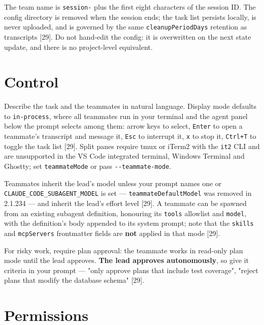 \documentclass[11pt,a4paper,twoside,openany]{book}
\begin{document}
The team name is \texttt{session-\allowbreak{}} plus the first eight characters of the session ID. The config directory is removed when the session ends; the task list persists locally, is never uploaded, and is governed by the same \texttt{cleanup\allowbreak{}Period\allowbreak{}Days} retention as transcripts [29]. Do not hand-edit the config: it is overwritten on the next state update, and there is no project-level equivalent.


\FloatBarrier
\setcounter{section}{2}
\section{Control}

Describe the task and the teammates in natural language. Display mode defaults to \texttt{in-\allowbreak{}process}, where all teammates run in your terminal and the agent panel below the prompt selects among them: arrow keys to select, \texttt{Enter} to open a teammate's transcript and message it, \texttt{Esc} to interrupt it, \texttt{x} to stop it, \texttt{Ctrl+T} to toggle the task list [29]. Split panes require tmux or iTerm2 with the \texttt{it2} CLI and are unsupported in the VS Code integrated terminal, Windows Terminal and Ghostty; set \texttt{teammate\allowbreak{}Mode} or pass \texttt{-\allowbreak{}-\allowbreak{}teammate-\allowbreak{}mode}.


Teammates inherit the lead's model unless your prompt names one or \texttt{CLAUDE\_\allowbreak{}CODE\_\allowbreak{}SUBAGENT\_\allowbreak{}MODEL} is set — \texttt{teammate\allowbreak{}Default\allowbreak{}Model} was removed in 2.1.234 — and inherit the lead's effort level [29]. A teammate can be spawned from an existing subagent definition, honouring its \texttt{tools} allowlist and \texttt{model}, with the definition's body appended to its system prompt; note that the \texttt{skills} and \texttt{mcp\allowbreak{}Servers} frontmatter fields are \textbf{not} applied in that mode [29].


For risky work, require plan approval: the teammate works in read-only plan mode until the lead approves. \textbf{The lead approves autonomously}, so give it criteria in your prompt — "only approve plans that include test coverage", "reject plans that modify the database schema" [29].


\FloatBarrier
\setcounter{section}{3}
\section{Permissions}
\end{document}
